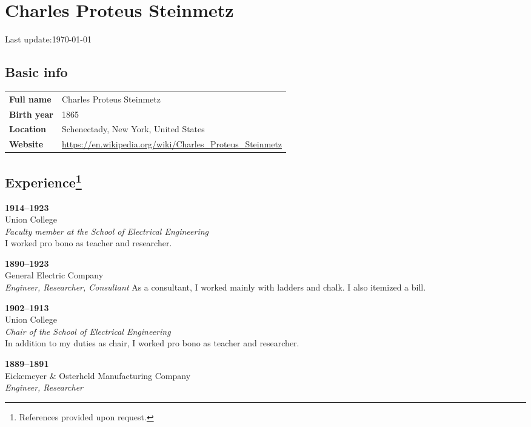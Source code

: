 \documentclass[a4paper]{article}
\newlength{\LASTUPDATESEP}\setlength{\LASTUPDATESEP}{1em}
\begin{document}
\section*{Charles Proteus Steinmetz}
\vspace{\LASTUPDATESEP}
Last update:\@ \today{}%
\vspace{\LASTUPDATESEP}
\subsection*{Basic info}
%
\begin{tabularx}{\textwidth}{@{}lX}
     \textbf{Full name}  & Charles Proteus Steinmetz
  \\ \textbf{Birth year} & 1865
  \\ \textbf{Location}   & Schenectady, New York, United States
  \\ \textbf{Website}    & \url{https://en.wikipedia.org/wiki/Charles_Proteus_Steinmetz}
\end{tabularx}
\subsection*{Experience\footnote{References provided upon request.}}
\textbf{1914--1923}                                             \\
Union College                                                   \\
\textit{Faculty member at the School of Electrical Engineering} \\
I worked pro bono as teacher and researcher.
\par
\textbf{1890--1923}      \\
General Electric Company \\
\textit{Engineer, Researcher, Consultant}
As a consultant, I worked mainly with ladders and chalk. I also itemized a bill.
\par
\textbf{1902--1913}                                    \\
Union College                                          \\
\textit{Chair of the School of Electrical Engineering} \\
In addition to my duties as chair, I worked pro bono as teacher and researcher.
\par
\textbf{1889--1891}                           \\
Eickemeyer \& Osterheld Manufacturing Company \\
\textit{Engineer, Researcher}
\end{document}
